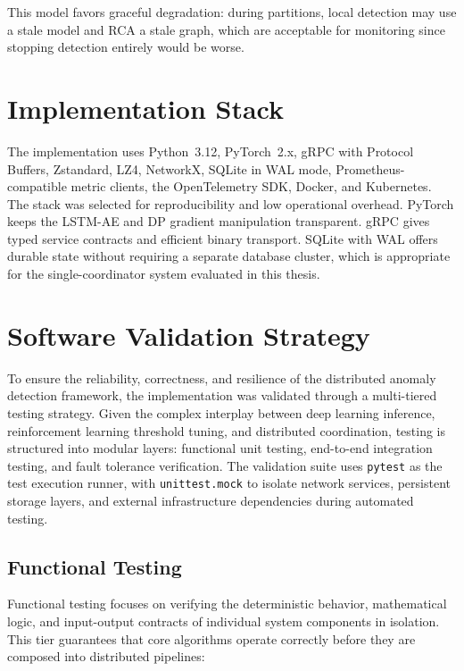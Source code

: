 This model favors graceful degradation: during partitions, local detection may
use a stale model and RCA a stale graph, which are acceptable for monitoring
since stopping detection entirely would be worse.

\section{Implementation Stack}
\label{subsec:design_stack}

The implementation uses Python~3.12, PyTorch~2.x, gRPC with Protocol Buffers,
Zstandard, LZ4, NetworkX, SQLite in WAL mode, Prometheus-compatible metric
clients, the OpenTelemetry SDK, Docker, and Kubernetes. The stack was selected
for reproducibility and low operational overhead. PyTorch keeps the LSTM-AE and
DP gradient manipulation transparent. gRPC gives typed service contracts and
efficient binary transport. SQLite with WAL offers durable state without
requiring a separate database cluster, which is appropriate for the
single-coordinator system evaluated in this thesis.

\section{Software Validation Strategy}
\label{sec:software_validation}

To ensure the reliability, correctness, and resilience of the distributed anomaly detection framework, the implementation was validated through a multi-tiered testing strategy. Given the complex interplay between deep learning inference, reinforcement learning threshold tuning, and distributed coordination, testing is structured into modular layers: functional unit testing, end-to-end integration testing, and fault tolerance verification. The validation suite uses \texttt{pytest} as the test execution runner, with \texttt{unittest.mock} to isolate network services, persistent storage layers, and external infrastructure dependencies during automated testing.

\subsection{Functional Testing}
\label{subsec:functional_testing}

Functional testing focuses on verifying the deterministic behavior, mathematical logic, and input-output contracts of individual system components in isolation. This tier guarantees that core algorithms operate correctly before they are composed into distributed pipelines:

